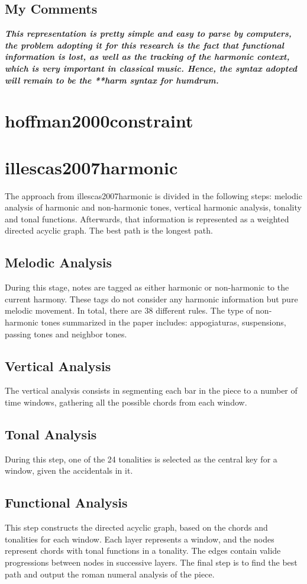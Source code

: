 		\subsection{My Comments}
			\emph{\textbf{
				This representation is pretty simple and easy to parse by computers, the problem adopting it for this research is the fact that functional information is lost, as well as the tracking of the harmonic context, which is very important in classical music. Hence, the syntax adopted will remain to be the **harm syntax for humdrum.
			}}
	\section{hoffman2000constraint }
	\section{illescas2007harmonic }
		The approach from illescas2007harmonic is divided in the following steps: melodic analysis of harmonic and non-harmonic tones, vertical harmonic analysis, tonality and tonal functions. Afterwards, that information is represented as a weighted directed acyclic graph. The best path is the longest path.
		\subsection{Melodic Analysis}
			During this stage, notes are tagged as either harmonic or non-harmonic to the current harmony. These tags do not consider any harmonic information but pure melodic movement.
			In total, there are 38 different rules. The type of non-harmonic tones summarized in the paper includes: appogiaturas, suspensions, passing tones and neighbor tones.
		\subsection{Vertical Analysis}
			The vertical analysis consists in segmenting each bar in the piece to a number of time windows, gathering all the possible chords from each window.
		\subsection{Tonal Analysis}
			During this step, one of the 24 tonalities is selected as the central key for a window, given the accidentals in it.
		\subsection{Functional Analysis}
			This step constructs the directed acyclic graph, based on the chords and tonalities for each window. Each layer represents a window, and the nodes represent chords with tonal functions in a tonality. The edges contain valide progressions between nodes in successive layers. The final step is to find the best path and output the roman numeral analysis of the piece.
